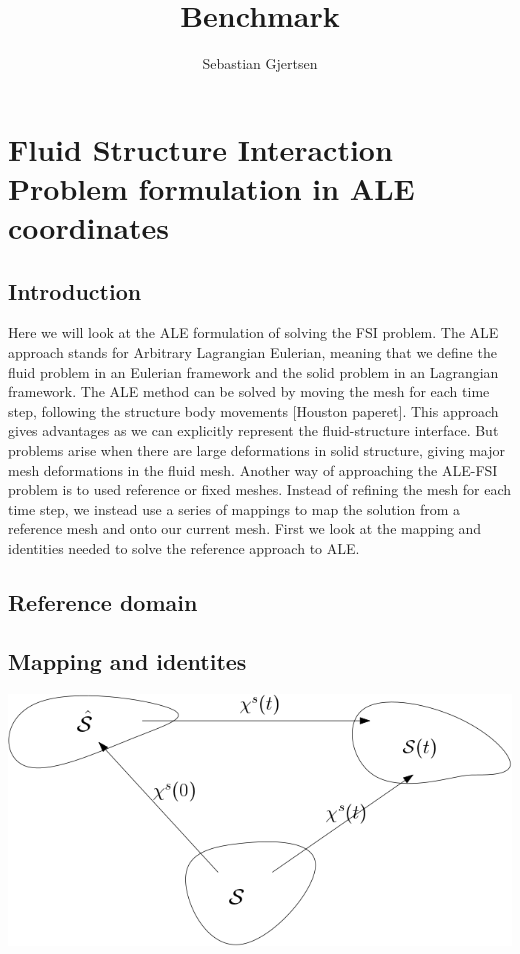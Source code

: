 
\usepackage{listings}
\usepackage{amsmath}
\title{Benchmark}
\author{Sebastian Gjertsen}

\maketitle

\section*{Fluid Structure Interaction Problem formulation in ALE coordinates}
\subsection*{Introduction}
Here we will look at the ALE formulation of solving the FSI problem. The ALE approach stands for Arbitrary Lagrangian Eulerian, meaning that we define the fluid problem in an Eulerian framework and the solid problem in an Lagrangian framework. The ALE method can be solved by moving the mesh for each time step, following the structure body movements [Houston paperet]. This approach gives advantages as we can explicitly represent the fluid-structure interface. But problems arise when there are large deformations in solid structure, giving major mesh deformations in the fluid mesh. Another way of approaching the ALE-FSI problem is to used reference or fixed meshes. Instead of refining the mesh for each time step, we instead use a series of mappings to map the solution from a reference mesh and onto our current mesh. First we look at the mapping and identities needed to solve the reference approach to ALE.
\subsection*{Reference domain}
\subsection*{Mapping and identites}
\includegraphics[scale=0.4]{continuum_mapping.png}

